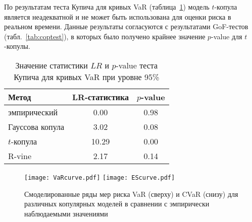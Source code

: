 По результатам теста Купича для кривых VaR (таблица~\ref{tab:kupiec}) модель $t$-копула является неадекватной и не может быть использована для оценки риска в реальном времени.
Данные результаты согласуются с результатами GoF-тестов (табл.~\ref{tab:coptest}), в которых было получено крайнее значение $p$-value для $t$-копулы.

\begin{table}[hbt!]
    \centering
    \caption{Значение статистики $LR$ и $p$-value теста Купича для кривых VaR при уровне 95\%}
    \label{tab:kupiec}
    \setlength{\tabcolsep}{10pt}
    \begin{tabular}{lcc} \toprule
        Метод & LR-статистика & $p$-value \\ \midrule
        эмпирический & 0.00 & 0.98 \\
        Гауссова копула & 3.02 & 0.08 \\
        $t$-копула & 10.29 & 0.00 \\
        R-vine & 2.17 & 0.14 \\ \bottomrule
    \end{tabular}
\end{table}


\begin{figure}[p]
    \centering
    \texttt{[image: VaRcurve.pdf]}
    \texttt{[image: EScurve.pdf]}
    \caption{Смоделированные ряды мер риска VaR (сверху) и CVaR (снизу)
    для различных копулярных моделей в сравнении с эмпирически наблюдаемыми значениями}
    \label{ris:VaR-ES-curve}
\end{figure}
